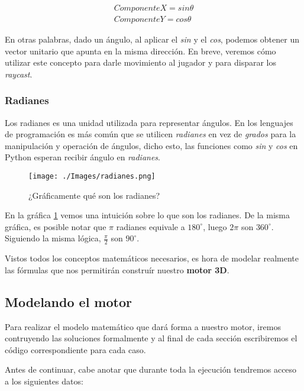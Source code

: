 \begin{equation}
\begin{aligned}
\label{unitvector}
ComponenteX = sin \theta \\
ComponenteY = cos \theta
\end{aligned}
\end{equation}

En otras palabras, dado un ángulo, al aplicar el \emph{sin} y el \emph{cos}, podemos obtener un vector unitario que apunta en la misma dirección. En breve, veremos cómo utilizar este concepto para darle movimiento al jugador y para disparar los \emph{raycast}.

\subsubsection{Radianes}

Los radianes es una unidad utilizada para representar ángulos. En los lenguajes de programación es más común que se utilicen \emph{radianes} en vez de \emph{grados} para la manipulación y operación de ángulos, dicho esto, las funciones como \emph{sin} y \emph{cos} en Python esperan recibir ángulo en \emph{radianes}. 

\begin{figure}[h!]
	\centering
	\texttt{[image: ./Images/radianes.png]}
	\caption{¿Gráficamente qué son los radianes?}
	\label{rads}
\end{figure}

En la gráfica \ref{rads} vemos una intuición sobre lo que son los radianes. De la misma gráfica, es posible notar que $\pi$ radianes equivale a $180^{\circ}
$, luego $2\pi$ son $360^{\circ}$. Siguiendo la misma lógica, $\frac{\pi}{2}$ son  $90^{\circ}$.


Vistos todos los conceptos matemáticos necesarios, es hora de modelar realmente las fórmulas que nos permitirán construír nuestro \textbf{motor 3D}.

\subsection{Modelando el motor}

Para realizar el modelo matemático que dará forma a nuestro motor, iremos contruyendo las soluciones formalmente y al final de cada sección escribiremos el código correspondiente para cada caso.

Antes de continuar, cabe anotar que durante toda la ejecución tendremos acceso a los siguientes datos:

